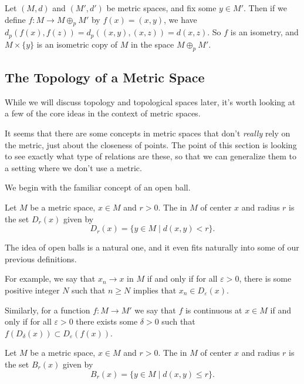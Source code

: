 \begin{example}
    Let $(M,d)$ and $(M', d')$ be metric spaces, and fix some $y \in M'$. Then if we define $f: M \rightarrow M \oplus_p M'$ by $f(x) = (x, y)$, we have $d_p(f(x), f(z)) = d_p((x, y), (x, z)) = d(x, z)$. So $f$ is an isometry, and $M \times \{y\}$ is an isometric copy of $M$ in the space $M \oplus_p M'$. 
\end{example}

\subsection{The Topology of a Metric Space}

While we will discuss topology and topological spaces later, it's worth looking at a few of the core ideas in the context of metric spaces.

It seems that there are some concepts in metric spaces that don't \emph{really} rely on the metric, just about the closeness of points. The point of this section is looking to see exactly what type of relations are these, so that we can generalize them to a setting where we don't use a metric.

We begin with the familiar concept of an open ball.

\begin{definition}
    Let $M$ be a metric space, $x \in M$ and $r > 0$. The  in $M$ of center $x$ and radius $r$ is the set $D_r(x)$ given by
    $$
    D_r(x) = \{y \in M \mid d(x, y) < r \}.
    $$
\end{definition}

The idea of open balls is a natural one, and it even fits naturally into some of our previous definitions.

For example, we say that $x_n \rightarrow x$ in $M$ if and only if for all $\varepsilon > 0$, there is some positive integer $N$ such that $n \geq N$ implies that $x_n \in D_{\varepsilon}(x)$.

Similarly, for a function $f: M \rightarrow M'$ we say that $f$ is continuous at $x \in M$ if and only if for all $\varepsilon > 0$ there exists some $\delta > 0$ such that $f(D_{\delta}(x)) \subset D_{\varepsilon}(f(x))$.

\begin{definition}
    Let $M$ be a metric space, $x \in M$ and $r > 0$. The  in $M$ of center $x$ and radius $r$ is the set $B_r(x)$ given by
    $$
B_r(x) = \{y \in M \mid d(x, y) \leq r\}.
    $$
\end{definition}

